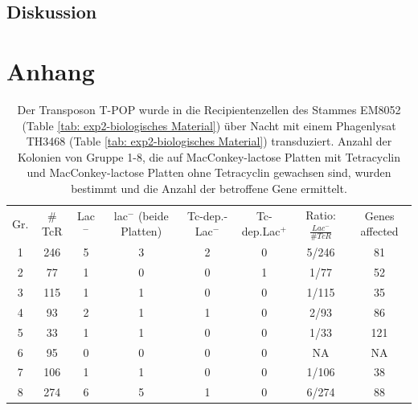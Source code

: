 \documentclass[oneside,10pt,a4paper]{report}
\begin{document}
		\section{Diskussion}

	
	
	\chapter{Anhang}
\begin{table}[H]
	\centering
	\caption{Der Transposon T-POP wurde in die Recipientenzellen des Stammes EM8052 (Table \ref{tab: exp2-biologisches Material}) über Nacht mit einem Phagenlysat TH3468 (Table \ref{tab: exp2-biologisches Material}) transduziert. Anzahl der Kolonien von Gruppe 1-8, die auf MacConkey-lactose Platten mit Tetracyclin und MacConkey-lactose Platten ohne Tetracyclin gewachsen sind, wurden bestimmt und die Anzahl der betroffene Gene ermittelt.}
	\label{tab: exp2-Rohdaten}
	\begin{tabular}{cccccccc}
		\toprule
		\multirow{2}{*}{Gr.} & \multirow{2}{*}{$\#$TcR} & \multirow{2}{*}{Lac$^-$}&\multirow{2}{*}{lac$^-$ (beide Platten)} & \multirow{2}{*}{Tc-dep.-Lac$^-$}& \multirow{2}{*}{Tc-dep.Lac$^+$}& \multirow{2}{*}{Ratio: $\frac{Lac^-}{\#TcR}$}&\multirow{2}{*}{\parbox[*]{1.2cm}{Genes affected}}\\
		&&&&&&&\\
		\midrule
		1 & 246 & 5 & 3 & 2 & 0 & 5/246 & 81\\
		2 & 77 & 1 & 0 & 0 & 1 & 1/77 & 52\\
		3 & 115 & 1 & 1 & 0 & 0 & 1/115& 35\\
		4 & 93 & 2 & 1 & 1 & 0 & 2/93 & 86\\
		5 & 33 & 1 & 1 & 0 & 0 & 1/33& 121\\
		6 & 95 & 0 & 0 & 0 & 0 & NA & NA\\
		7 & 106 & 1 & 1 & 0 & 0 & 1/106 & 38\\
		8 & 274 & 6 & 5 & 1 & 0 & 6/274 & 88\\
		\bottomrule			
	\end{tabular}
\end{table}
	
	
	
	
	\nocite{*}
	
	\newpage
\end{document}
